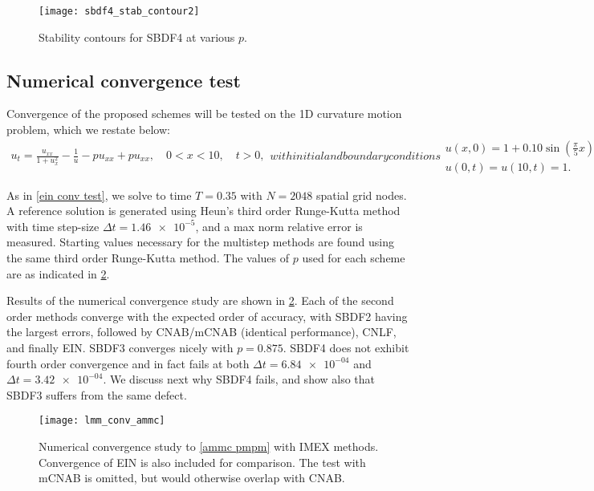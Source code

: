 \begin{figure}[htb!]
        \centering
\texttt{[image: sbdf4\_stab\_contour2]}
\caption[Stability contours for SBDF4 at various $p$]{Stability contours for SBDF4 at various $p$.}
\label{sbdf4 contours}
\end{figure}

\subsection{Numerical convergence test}
Convergence of the proposed schemes will be tested on the 1D curvature motion problem, which we restate below:
\begin{subequations}
\begin{align}
        u_t = \frac{u_{xx}}{1 + u_x^2} - \frac{1}{u} - pu_{xx} + pu_{xx},
\quad 0< x< 10,\quad t>0,
\end{align}
with initial and boundary conditions
\begin{gather}
        u(x,0) = 1 + 0.10\sin\left(\frac{\pi}{5}x \right) 
\\
u(0,t) = u(10,t) = 1.
\end{gather}
\label{ammc pmpm}
\end{subequations}

As in \cref{ein conv test}, we solve to time $T=0.35$ with $N=2048$ spatial grid nodes. A reference solution is generated using Heun's third order Runge-Kutta method \cite{hundsdorfer2013numerical} with time step-size $\Delta t = \num{1.46e-5}$, and a max norm relative error is measured. Starting values necessary for the multistep methods are found using the same third order Runge-Kutta method. The values of $p$ used for each scheme are as indicated in \cref{lmm conv test}.

Results of the numerical convergence study are shown in \cref{lmm conv test}. Each of the second order methods converge with the expected order of accuracy, with SBDF2 having the largest errors, followed by CNAB/mCNAB (identical performance), CNLF, and finally EIN. SBDF3 converges nicely with $p=0.875$. SBDF4 does not exhibit fourth order convergence and in fact fails at both $\Delta t =\num{6.84e-04}$ and $\Delta t=\num{3.42e-04}$. We discuss next why SBDF4 fails, and show also that SBDF3 suffers from the same defect.

\begin{figure}
        \centering
\texttt{[image: lmm\_conv\_ammc]}
\caption[Numerical convergence study with IMEX methods]{Numerical convergence study to \cref{ammc pmpm} with IMEX methods. Convergence of EIN is also included for comparison. The test with mCNAB is omitted, but would otherwise overlap with CNAB.}
\label{lmm conv test}
\end{figure}

